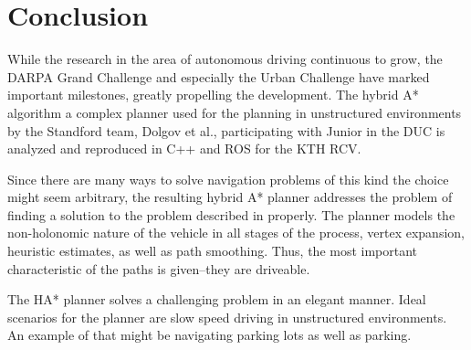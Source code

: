\chapter{Conclusion}
While the research in the area of autonomous driving continuous to grow, the DARPA Grand Challenge and especially the Urban Challenge have marked important milestones, greatly propelling the development. The hybrid A* algorithm a complex planner used for the planning in unstructured environments by the Standford team, Dolgov et al., participating with Junior in the DUC is analyzed and reproduced in C++ and ROS for the KTH RCV.

Since there are many ways to solve navigation problems of this kind the choice might seem arbitrary, the resulting hybrid A* planner addresses the problem of finding a solution to the problem described in  properly. The planner models the non-holonomic nature of the vehicle in all stages of the process, vertex expansion, heuristic estimates, as well as path smoothing. Thus, the most important characteristic of the paths is given--they are driveable. 

The HA* planner solves a challenging problem in an elegant manner. Ideal scenarios for the planner are slow speed driving in unstructured environments. An example of that might be navigating parking lots as well as parking.